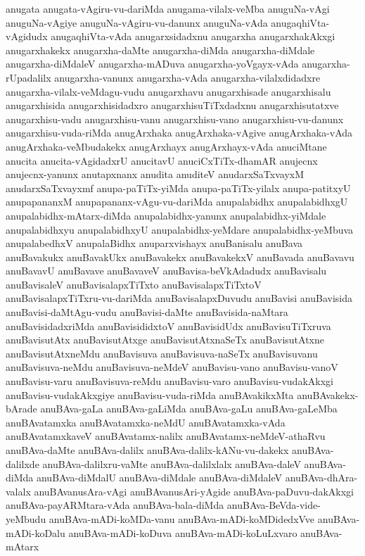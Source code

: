 {anugata
anugata-vAgiru-vu-dariMda
anugama-vilalx-veMba
anuguNa-vAgi
anuguNa-vAgiye
anuguNa-vAgiru-vu-danunx
anuguNa-vAda
anugaqhiVta-vAgidudx
anugaqhiVta-vAda
anugarxsidadxnu
anugarxha
anugarxhakAkxgi
anugarxhakekx
anugarxha-daMte
anugarxha-diMda
anugarxha-diMdale
anugarxha-diMdaleV
anugarxha-mADuva
anugarxha-yoVgayx-vAda
anugarxha-rUpadalilx
anugarxha-vanunx
anugarxha-vAda
anugarxha-vilalxdidadxre
anugarxha-vilalx-veMdagu-vudu
anugarxhavu
anugarxhisade
anugarxhisalu
anugarxhisida
anugarxhisidadxro
anugarxhisuTiTxdadxnu
anugarxhisutatxve
anugarxhisu-vadu
anugarxhisu-vanu
anugarxhisu-vano
anugarxhisu-vu-danunx
anugarxhisu-vuda-riMda
anugArxhaka
anugArxhaka-vAgive
anugArxhaka-vAda
anugArxhaka-veMbudakekx
anugArxhayx
anugArxhayx-vAda
anuciMtane
anucita
anucita-vAgidadxrU
anucitavU
anuciCxTiTx-dhamAR
anujecnx
anujecnx-yanunx
anutapxnanx
anudita
anuditeV
anudarxSaTxvayxM
anudarxSaTxvayxmf
anupa-paTiTx-yiMda
anupa-paTiTx-yilalx
anupa-patitxyU
anupapananxM
anupapananx-vAgu-vu-dariMda
anupalabidhx
anupalabidhxgU
anupalabidhx-mAtarx-diMda
anupalabidhx-yanunx
anupalabidhx-yiMdale
anupalabidhxyu
anupalabidhxyU
anupalabidhx-yeMdare
anupalabidhx-yeMbuva
anupalabedhxV
anupalaBidhx
anuparxvishayx
anuBanisalu
anuBava
anuBavakukx
anuBavakUkx
anuBavakekx
anuBavakekxV
anuBavada
anuBavavu
anuBavavU
anuBavave
anuBavaveV
anuBavisa-beVkAdadudx
anuBavisalu
anuBavisaleV
anuBavisalapxTiTxto
anuBavisalapxTiTxtoV
anuBavisalapxTiTxru-vu-dariMda
anuBavisalapxDuvudu
anuBavisi
anuBavisida
anuBavisi-daMtAgu-vudu
anuBavisi-daMte
anuBavisida-naMtara
anuBavisidadxriMda
anuBavisididxtoV
anuBavisidUdx
anuBavisuTiTxruva
anuBavisutAtx
anuBavisutAtxge
anuBavisutAtxnaSeTx
anuBavisutAtxne
anuBavisutAtxneMdu
anuBavisuva
anuBavisuva-naSeTx
anuBavisuvanu
anuBavisuva-neMdu
anuBavisuva-neMdeV
anuBavisu-vano
anuBavisu-vanoV
anuBavisu-varu
anuBavisuva-reMdu
anuBavisu-varo
anuBavisu-vudakAkxgi
anuBavisu-vudakAkxgiye
anuBavisu-vuda-riMda
anuBAvakikxMta
anuBAvakekx-bArade
anuBAva-gaLa
anuBAva-gaLiMda
anuBAva-gaLu
anuBAva-gaLeMba
anuBAvatamxka
anuBAvatamxka-neMdU
anuBAvatamxka-vAda
anuBAvatamxkaveV
anuBAvatamx-nalilx
anuBAvatamx-neMdeV-athaRvu
anuBAva-daMte
anuBAva-dalilx
anuBAva-dalilx-kANu-vu-dakekx
anuBAva-dalilxde
anuBAva-dalilxru-vaMte
anuBAva-dalilxlalx
anuBAva-daleV
anuBAva-diMda
anuBAva-diMdalU
anuBAva-diMdale
anuBAva-diMdaleV
anuBAva-dhAra-valalx
anuBAvanusAra-vAgi
anuBAvanusAri-yAgide
anuBAva-paDuvu-dakAkxgi
anuBAva-payARMtara-vAda
anuBAva-bala-diMda
anuBAva-BeVda-vide-yeMbudu
anuBAva-mADi-koMDa-vanu
anuBAva-mADi-koMDidedxVve
anuBAva-mADi-koDalu
anuBAva-mADi-koDuva
anuBAva-mADi-koLuLxvaro
anuBAva-mAtarx
}
